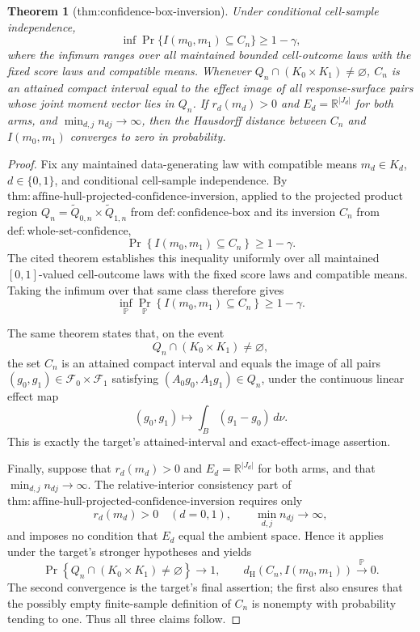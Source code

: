 \documentclass{article}
\newtheorem{theorem}{Theorem}
\begin{document}
\begin{theorem}[thm:confidence-box-inversion]\label{thm:confidence-box-inversion}
Under conditional cell-sample independence,
\[
\inf\Pr\{I(m_0,m_1)\subseteq C_n\}\geq1-\gamma,
\]
where the infimum ranges over all maintained bounded cell-outcome laws with the
fixed score laws and compatible means. Whenever
\(Q_n\cap(K_0\times K_1)\neq\varnothing\), \(C_n\) is an attained compact
interval equal to the effect image of all response-surface pairs whose joint
moment vector lies in \(Q_n\). If \(r_d(m_d)>0\) and
\(E_d=\mathbb R^{|J_d|}\) for both arms, and
\(\min_{d,j}n_{dj}\to\infty\), then the Hausdorff distance between \(C_n\) and
\(I(m_0,m_1)\) converges to zero in probability.
\end{theorem}
\begin{proof}
Fix any maintained data-generating law with compatible means \(m_d\in K_d\), \(d\in\{0,1\}\), and conditional cell-sample independence.  By \(\mathrm{thm:affine\mbox{-}hull\mbox{-}projected\mbox{-}confidence\mbox{-}inversion}\), applied to the projected product region \(Q_n=\widetilde Q_{0,n}\times\widetilde Q_{1,n}\) from \(\mathrm{def:confidence\mbox{-}box}\) and its inversion \(C_n\) from \(\mathrm{def:whole\mbox{-}set\mbox{-}confidence}\),
\[
 \Pr\!\left\{I(m_0,m_1)\subseteq C_n\right\}\ge 1-\gamma.
\]
The cited theorem establishes this inequality uniformly over all maintained \([0,1]\)-valued cell-outcome laws with the fixed score laws and compatible means.  Taking the infimum over that same class therefore gives
\[
 \inf_{\mathbb P}\Pr_{\mathbb P}\!\left\{I(m_0,m_1)\subseteq C_n\right\}\ge 1-\gamma.
\]

The same theorem states that, on the event
\[
 Q_n\cap(K_0\times K_1)\ne\varnothing,
\]
the set \(C_n\) is an attained compact interval and equals the image of all pairs \((g_0,g_1)\in\mathcal F_0\times\mathcal F_1\) satisfying \((A_0g_0,A_1g_1)\in Q_n\), under the continuous linear effect map
\[
 (g_0,g_1)\longmapsto \int_B(g_1-g_0)\,d\nu.
\]
This is exactly the target's attained-interval and exact-effect-image assertion.

Finally, suppose that \(r_d(m_d)>0\) and \(E_d=\mathbb R^{|J_d|}\) for both arms, and that \(\min_{d,j}n_{dj}\to\infty\).  The relative-interior consistency part of \(\mathrm{thm:affine\mbox{-}hull\mbox{-}projected\mbox{-}confidence\mbox{-}inversion}\) requires only
\[
 r_d(m_d)>0\quad(d=0,1),
 \qquad
 \min_{d,j}n_{dj}\longrightarrow\infty,
\]
and imposes no condition that \(E_d\) equal the ambient space.  Hence it applies under the target's stronger hypotheses and yields
\[
 \Pr\!\left\{Q_n\cap(K_0\times K_1)\ne\varnothing\right\}\longrightarrow1,
 \qquad
 d_{\mathrm H}\!\left(C_n,I(m_0,m_1)\right)\xrightarrow{\mathbb P}0.
\]
The second convergence is the target's final assertion; the first also ensures that the possibly empty finite-sample definition of \(C_n\) is nonempty with probability tending to one.  Thus all three claims follow.
\end{proof}
\end{document}
